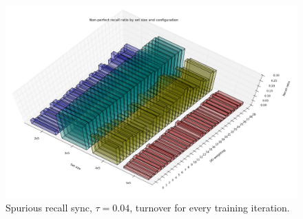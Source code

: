\begin{figure}
    \centering
    \includegraphics[width=13cm]{fig/DGWs/cut/non_perfect_recall_by_dgw_async_tm1_04_cut}
    \caption{Spurious recall sync, $\tau=0.04$, turnover for every training iteration.}
    \label{fig:non_perfect_recall_by_dgw_async_tm1_04}
\end{figure}

